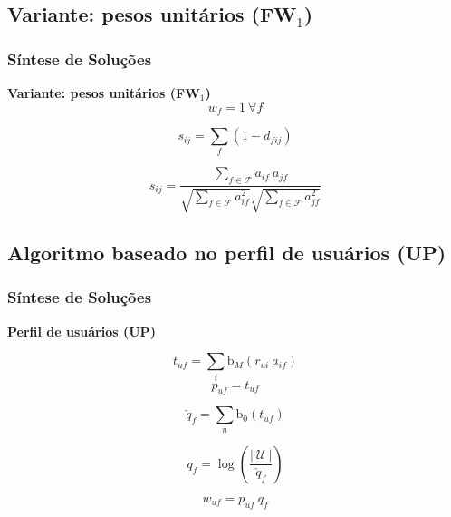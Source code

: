 \subsection{Variante: pesos unitários (FW$_1$)} %
\label{sub:variante_pesos_unit_rios}

\begin{frame}
\frametitle{Síntese de Soluções}
\textbf{Variante: pesos unitários (FW$_1$)}
\begin{equation}
w_f = 1~\forall f
\end{equation} 

\begin{equation} 
\label{eq:sij1}
    s_{ij} = \sum_{f}{\left(1-d_{fij}\right)}
\end{equation}

\begin{equation} 
\label{eq:scos}
    s_{ij} = \frac{\sum\limits_{f \in \mathcal{F}}{a_{if}~a_{jf}}}{\sqrt{\sum\limits_{f \in \mathcal{F}}a_{if}^2} \sqrt{\sum\limits_{f \in \mathcal{F}}a_{jf}^2}}
\end{equation}
\end{frame}


\subsection{Algoritmo baseado no perfil de usuários (UP)} %
\label{sec:algoritmo_baseado_no_perfil_de_usu_rios_}


\begin{frame}
\frametitle{Síntese de Soluções}
\textbf{Perfil de usuários (UP)}

\begin{equation}
\label{eq:puf} 
    t_{uf} = \sum_{i}{\mathrm{b}_M\left(r_{ui}~a_{if}\right)} 
\end{equation} 
\begin{equation}
\label{eq:tf} 
    p_{uf} = t_{uf}
\end{equation} 

\begin{equation}
\label{eq:uf} 
    \check{q}_{f} = \sum_{u}{\mathrm{b}_0\left(t_{uf}\right)}
\end{equation} 

\begin{equation}
\label{eq:iuf} 
    q_{f} = \log \left( \frac{\left|~\mathcal{U}~\right|}{\check{q}_{f}} \right)
\end{equation} 


\begin{equation}
\label{eq:w-tfidf} 
    w_{uf} = p_{uf}~q_{f}
\end{equation} 

\end{frame}


